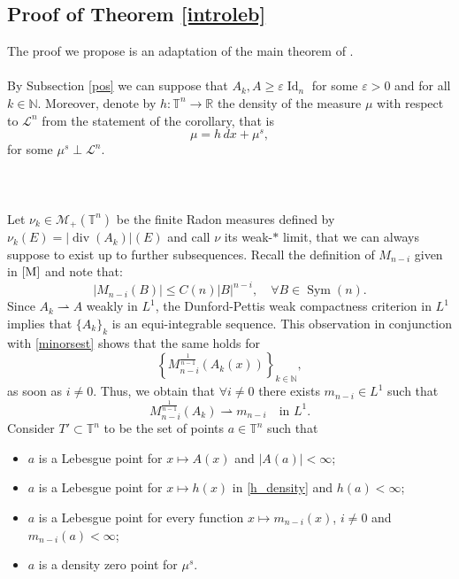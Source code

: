\documentclass[10pt,reqno]{amsart}
\numberwithin{equation}{section}
\newcommand{\R}{\mathbb{R}}
\newcommand{\T}{\mathbb{T}}
\newcommand{\N}{\mathbb{N}}
\DeclareMathOperator{\Id}{Id}
\DeclareMathOperator{\dv}{div}
\DeclareMathOperator{\Sym}{Sym}
\theoremstyle{plain}
\theoremstyle{definition}
\theoremstyle{remark}
\begin{document}
\subsection{Proof of Theorem \ref{introleb}}
The proof we propose is an adaptation of the main theorem of \cite{USC}.
\\
\\
By Subsection \ref{pos} we can suppose that $A_k, A\geq \varepsilon \Id_n$ for some $\varepsilon>0$ and for all $k \in \N$.  Moreover, denote by $h:\T^n\rightarrow \R$ the density of the measure $\mu$ with respect to $\mathcal{L}^n$ from the statement of the corollary, that is 
\begin{equation}\label{h_density}
\mu =h\,dx+\mu^s,
\end{equation}
for some $\mu^s\perp \mathcal{L}^n$.
\\
\\
\indent{}
\\
\\
Let $\nu_{k} \in \mathcal{M}_+(\T^n)$ be the finite Radon measures defined by $\nu_k (E)= |\dv(A_k)|(E)$ and call $\nu$ its weak-$*$ limit, that we can always suppose to exist up to further subsequences. Recall the definition of $M_{n-i}$ given in $\eqref{M}$ and note that:
\begin{equation}\label{minorsest}
|M_{n-i}(B)|\leq C(n)|B|^{n-i}, \quad \forall B \in \Sym(n).
\end{equation}
Since $A_k \rightharpoonup A$ weakly in $L^1$, the Dunford-Pettis weak compactness criterion in $L^1$ implies that $\{A_k\}_k$ is an equi-integrable sequence. This observation in conjunction with \eqref{minorsest} shows that the same holds for 
\[
\left\{M^\frac{1}{n-1}_{n-i}(A_k(x))\right\}_{k \in \N},
\]
 as soon as $i \neq 0$. Thus, we obtain that $\forall i\neq 0$ there exists $m_{n-i}\in L^1$ such that 
\begin{equation}\label{minors_weak_compact}
M_{n-i}^{\frac{1}{n-1}}(A_k)\rightharpoonup m_{n-i}\quad \text{in } L^1.
\end{equation}
Consider $T' \subset \T^n$ to be the set of points $a \in \T^n$ such that
\begin{itemize}
\item $a$ is a Lebesgue point for $x \mapsto A(x)$ and $|A(a)|<\infty$;
\item $a$ is a Lebesgue point for $x \mapsto h(x)$ in \eqref{h_density} and $h(a)<\infty$;
\item $a$ is a Lebesgue point for every function $x \mapsto m_{n-i}(x)$, $i\neq 0$ and $m_{n-i}(a)<\infty$;
\item $a$ is a density zero point for $\mu^s$.
\end{itemize}
\end{document}
